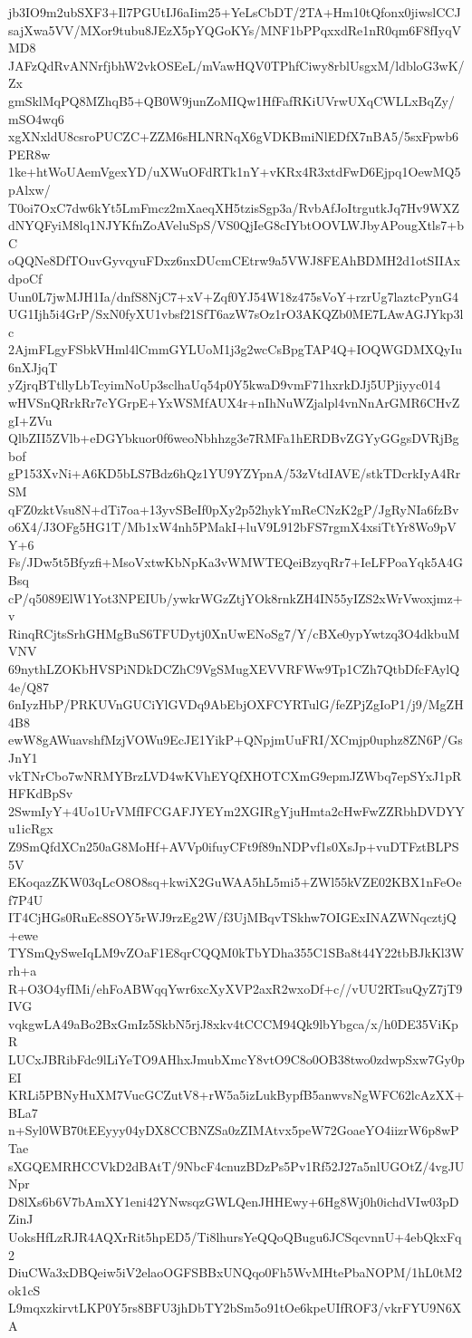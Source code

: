 jb3IO9m2ubSXF3+Il7PGUtIJ6aIim25+YeLsCbDT/2TA+Hm10tQfonx0jiwslCCJ
sajXwa5VV/MXor9tubu8JEzX5pYQGoKYs/MNF1bPPqxxdRe1nR0qm6F8fIyqVMD8
JAFzQdRvANNrfjbhW2vkOSEeL/mVawHQV0TPhfCiwy8rblUsgxM/ldbloG3wK/Zx
gmSklMqPQ8MZhqB5+QB0W9junZoMIQw1HfFafRKiUVrwUXqCWLLxBqZy/mSO4wq6
xgXNxldU8csroPUCZC+ZZM6sHLNRNqX6gVDKBmiNlEDfX7nBA5/5sxFpwb6PER8w
1ke+htWoUAemVgexYD/uXWuOFdRTk1nY+vKRx4R3xtdFwD6Ejpq1OewMQ5pAlxw/
T0oi7OxC7dw6kYt5LmFmcz2mXaeqXH5tzisSgp3a/RvbAfJoItrgutkJq7Hv9WXZ
dNYQFyiM8lq1NJYKfnZoAVeluSpS/VS0QjIeG8cIYbtOOVLWJbyAPougXtls7+bC
oQQNe8DfTOuvGyvqyuFDxz6nxDUcmCEtrw9a5VWJ8FEAhBDMH2d1otSIIAxdpoCf
Uun0L7jwMJH1Ia/dnfS8NjC7+xV+Zqf0YJ54W18z475sVoY+rzrUg7laztcPynG4
UG1Ijh5i4GrP/SxN0fyXU1vbsf21SfT6azW7sOz1rO3AKQZb0ME7LAwAGJYkp3lc
2AjmFLgyFSbkVHml4lCmmGYLUoM1j3g2wcCsBpgTAP4Q+IOQWGDMXQyIu6nXJjqT
yZjrqBTtllyLbTcyimNoUp3sclhaUq54p0Y5kwaD9vmF71hxrkDJj5UPjiyyc014
wHVSnQRrkRr7cYGrpE+YxWSMfAUX4r+nIhNuWZjalpl4vnNnArGMR6CHvZgI+ZVu
QlbZII5ZVlb+eDGYbkuor0f6weoNbhhzg3e7RMFa1hERDBvZGYyGGgsDVRjBgbof
gP153XvNi+A6KD5bLS7Bdz6hQz1YU9YZYpnA/53zVtdIAVE/stkTDcrkIyA4RrSM
qFZ0zktVsu8N+dTi7oa+13yvSBeIf0pXy2p52hykYmReCNzK2gP/JgRyNIa6fzBv
o6X4/J3OFg5HG1T/Mb1xW4nh5PMakI+luV9L912bFS7rgmX4xsiTtYr8Wo9pVY+6
Fs/JDw5t5Bfyzfi+MsoVxtwKbNpKa3vWMWTEQeiBzyqRr7+IeLFPoaYqk5A4GBsq
cP/q5089ElW1Yot3NPEIUb/ywkrWGzZtjYOk8rnkZH4IN55yIZS2xWrVwoxjmz+v
RinqRCjtsSrhGHMgBuS6TFUDytj0XnUwENoSg7/Y/cBXe0ypYwtzq3O4dkbuMVNV
69nythLZOKbHVSPiNDkDCZhC9VgSMugXEVVRFWw9Tp1CZh7QtbDfcFAylQ4e/Q87
6nIyzHbP/PRKUVnGUCiYlGVDq9AbEbjOXFCYRTulG/feZPjZgIoP1/j9/MgZH4B8
ewW8gAWuavshfMzjVOWu9EcJE1YikP+QNpjmUuFRI/XCmjp0uphz8ZN6P/GsJnY1
vkTNrCbo7wNRMYBrzLVD4wKVhEYQfXHOTCXmG9epmJZWbq7epSYxJ1pRHFKdBpSv
2SwmIyY+4Uo1UrVMfIFCGAFJYEYm2XGIRgYjuHmta2cHwFwZZRbhDVDYYu1icRgx
Z9SmQfdXCn250aG8MoHf+AVVp0ifuyCFt9f89nNDPvf1s0XsJp+vuDTFztBLPS5V
EKoqazZKW03qLcO8O8sq+kwiX2GuWAA5hL5mi5+ZWl55kVZE02KBX1nFeOef7P4U
IT4CjHGs0RuEc8SOY5rWJ9rzEg2W/f3UjMBqvTSkhw7OIGExINAZWNqcztjQ+ewe
TYSmQySweIqLM9vZOaF1E8qrCQQM0kTbYDha355C1SBa8t44Y22tbBJkKl3Wrh+a
R+O3O4yfIMi/ehFoABWqqYwr6xcXyXVP2axR2wxoDf+c//vUU2RTsuQyZ7jT9IVG
vqkgwLA49aBo2BxGmIz5SkbN5rjJ8xkv4tCCCM94Qk9lbYbgca/x/h0DE35ViKpR
LUCxJBRibFdc9lLiYeTO9AHhxJmubXmcY8vtO9C8o0OB38two0zdwpSxw7Gy0pEI
KRLi5PBNyHuXM7VucGCZutV8+rW5a5izLukBypfB5anwvsNgWFC62lcAzXX+BLa7
n+Syl0WB70tEEyyy04yDX8CCBNZSa0zZIMAtvx5peW72GoaeYO4iizrW6p8wPTae
sXGQEMRHCCVkD2dBAtT/9NbcF4cnuzBDzPs5Pv1Rf52J27a5nlUGOtZ/4vgJUNpr
D8lXs6b6V7bAmXY1eni42YNwsqzGWLQenJHHEwy+6Hg8Wj0h0ichdVIw03pDZinJ
UoksHfLzRJR4AQXrRit5hpED5/Ti8lhursYeQQoQBugu6JCSqcvnnU+4ebQkxFq2
DiuCWa3xDBQeiw5iV2elaoOGFSBBxUNQqo0Fh5WvMHtePbaNOPM/1hL0tM2ok1cS
L9mqxzkirvtLKP0Y5rs8BFU3jhDbTY2bSm5o91tOe6kpeUIfROF3/vkrFYU9N6XA
